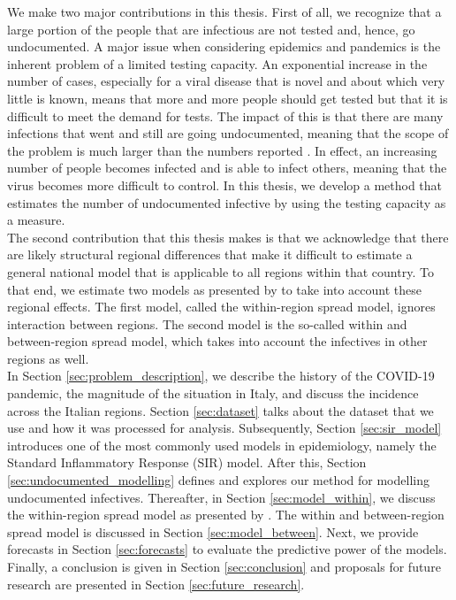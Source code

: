 \documentclass[12pt]{article}
\begin{document}
	We make two major contributions in this thesis. First of all, we recognize that a large portion of the people that are infectious are not tested and, hence, go undocumented. A major issue when considering epidemics and pandemics is the inherent problem of a limited testing capacity. An exponential increase in the number of cases, especially for a viral disease that is novel and about which very little is known, means that more and more people should get tested but that it is difficult to meet the demand for tests. The impact of this is that there are many infections that went and still are going undocumented, meaning that the scope of the problem is much larger than the numbers reported \parencite{li2020undocumented}. In effect, an increasing number of people becomes infected and is able to infect others, meaning that the virus becomes more difficult to control. In this thesis, we develop a method that estimates the number of undocumented infective by using the testing capacity as a measure. \\
	
	The second contribution that this thesis makes is that we acknowledge that there are likely structural regional differences that make it difficult to estimate a general national model that is applicable to all regions within that country. To that end, we estimate two models as presented by \textcite{adda2016economic} to take into account these regional effects. The first model, called the within-region spread model, ignores interaction between regions. The second model is the so-called within and between-region spread model, which takes into account the infectives in other regions as well. \\
	
	In Section \ref{sec:problem_description}, we describe the history of the COVID-19 pandemic, the magnitude of the situation in Italy, and discuss the incidence across the Italian regions. Section \ref{sec:dataset} talks about the dataset that we use and how it was processed for analysis. Subsequently, Section \ref{sec:sir_model} introduces one of the most commonly used models in epidemiology, namely the Standard Inflammatory Response (SIR) model. After this, Section \ref{sec:undocumented_modelling} defines and explores our method for modelling undocumented infectives. Thereafter, in Section \ref{sec:model_within}, we discuss the within-region spread model as presented by \textcite{adda2016economic}. The within and between-region spread model is discussed in Section \ref{sec:model_between}. Next, we provide forecasts in Section \ref{sec:forecasts} to evaluate the predictive power of the models. Finally, a conclusion is given in Section \ref{sec:conclusion} and proposals for future research are presented in Section \ref{sec:future_research}.
	
\end{document}
